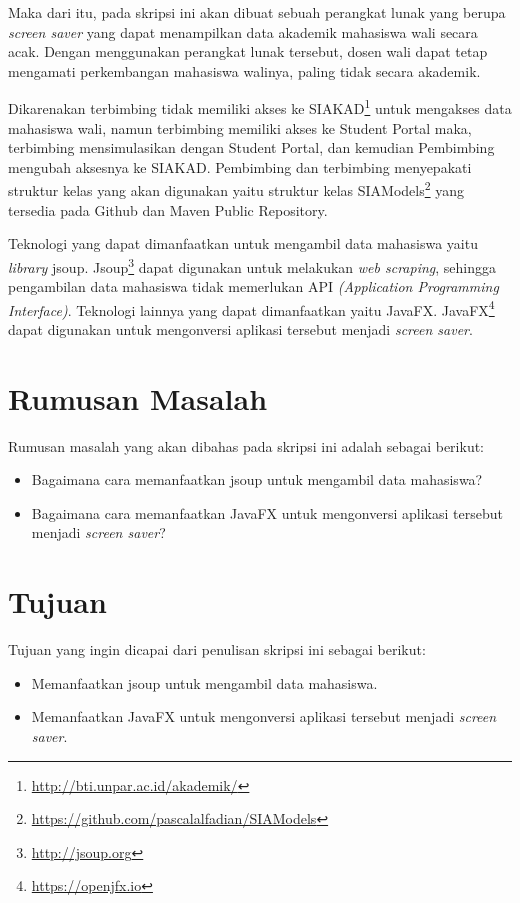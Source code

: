 \documentclass[a4paper,twoside]{article}
\begin{document}
Maka dari itu, pada skripsi ini akan dibuat sebuah perangkat lunak yang berupa \textit{screen saver} yang dapat menampilkan data akademik mahasiswa wali secara acak. Dengan menggunakan perangkat lunak tersebut, dosen wali dapat tetap mengamati perkembangan mahasiswa walinya, paling tidak secara akademik.

Dikarenakan terbimbing tidak memiliki akses ke SIAKAD\footnote{\url{http://bti.unpar.ac.id/akademik/}} untuk mengakses data mahasiswa wali, namun terbimbing memiliki akses ke Student Portal maka, terbimbing mensimulasikan dengan Student Portal, dan kemudian Pembimbing mengubah aksesnya ke SIAKAD. Pembimbing dan terbimbing menyepakati struktur kelas yang akan digunakan yaitu struktur kelas SIAModels\footnote{\url{https://github.com/pascalalfadian/SIAModels}} yang tersedia pada Github dan Maven Public Repository.

Teknologi yang dapat dimanfaatkan untuk mengambil data mahasiswa yaitu \textit{library} jsoup. Jsoup\footnote{\url{http://jsoup.org}} dapat digunakan untuk melakukan \textit{web scraping}, sehingga pengambilan data mahasiswa tidak memerlukan API \textit{(Application Programming Interface)}. Teknologi lainnya yang dapat dimanfaatkan yaitu JavaFX. JavaFX\footnote{\url{https://openjfx.io}} dapat digunakan untuk mengonversi aplikasi tersebut menjadi \textit{screen saver}.

\section{Rumusan Masalah}
Rumusan masalah yang akan dibahas pada skripsi ini adalah sebagai berikut:
\begin{itemize}
	\item Bagaimana cara memanfaatkan jsoup untuk mengambil data mahasiswa?
	\item Bagaimana cara memanfaatkan JavaFX untuk mengonversi aplikasi tersebut menjadi \textit{screen saver}?
\end{itemize}   

\section{Tujuan}
Tujuan yang ingin dicapai dari penulisan skripsi ini sebagai berikut:
\begin{itemize}
    \item Memanfaatkan jsoup untuk mengambil data mahasiswa.
    \item Memanfaatkan JavaFX untuk mengonversi aplikasi tersebut menjadi \textit{screen saver}.
\end{itemize}
\end{document}
